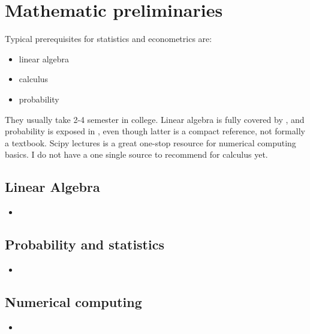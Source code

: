 \documentclass[letterpaper,10pt,english]{sphinxmanual}
\begin{document}
\section{Mathematic preliminaries}
\label{\detokenize{textbook/preliminaries:mathematic-preliminaries}}\label{\detokenize{textbook/preliminaries::doc}}
Typical prerequisites for statistics and econometrics are:
\begin{itemize}
\item {} 
linear algebra

\item {} 
calculus

\item {} 
probability

\end{itemize}

They usually take 2-4 semester in college. Linear algebra is fully covered by
, and probability is exposed in , even though latter is a compact reference, not formally a textbook. Scipy lectures is a great one-stop resource for numerical computing basics. I do not have a one single source to recommend for calculus yet.


\subsection{Linear Algebra}
\label{\detokenize{textbook/preliminaries:linear-algebra}}\begin{itemize}
\item {} 

\end{itemize}


\subsection{Probability and statistics}
\label{\detokenize{textbook/preliminaries:probability-and-statistics}}\begin{itemize}
\item {} 

\end{itemize}


\subsection{Numerical computing}
\label{\detokenize{textbook/preliminaries:numerical-computing}}\begin{itemize}
\item {} 

\end{itemize}
\end{document}
